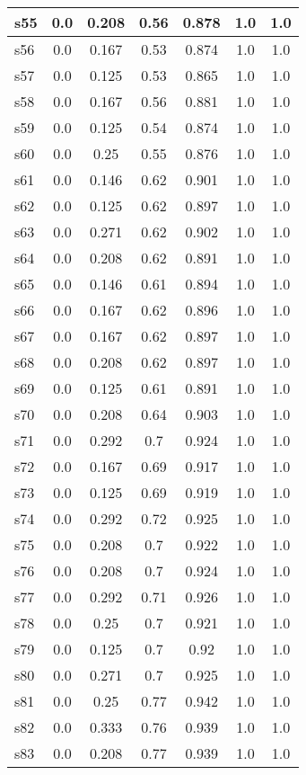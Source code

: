 \documentclass{article}
\begin{document}
\begin{tabular}{|l|c|c|c|c|c|c|}
s55 &0.0 & 0.208 & 0.56 & 0.878 & 1.0 & 1.0\\
\hline
s56 &0.0 & 0.167 & 0.53 & 0.874 & 1.0 & 1.0\\
\hline
s57 &0.0 & 0.125 & 0.53 & 0.865 & 1.0 & 1.0\\
\hline
s58 &0.0 & 0.167 & 0.56 & 0.881 & 1.0 & 1.0\\
\hline
s59 &0.0 & 0.125 & 0.54 & 0.874 & 1.0 & 1.0\\
\hline
s60 &0.0 & 0.25 & 0.55 & 0.876 & 1.0 & 1.0\\
\hline
s61 &0.0 & 0.146 & 0.62 & 0.901 & 1.0 & 1.0\\
\hline
s62 &0.0 & 0.125 & 0.62 & 0.897 & 1.0 & 1.0\\
\hline
s63 &0.0 & 0.271 & 0.62 & 0.902 & 1.0 & 1.0\\
\hline
s64 &0.0 & 0.208 & 0.62 & 0.891 & 1.0 & 1.0\\
\hline
s65 &0.0 & 0.146 & 0.61 & 0.894 & 1.0 & 1.0\\
\hline
s66 &0.0 & 0.167 & 0.62 & 0.896 & 1.0 & 1.0\\
\hline
s67 &0.0 & 0.167 & 0.62 & 0.897 & 1.0 & 1.0\\
\hline
s68 &0.0 & 0.208 & 0.62 & 0.897 & 1.0 & 1.0\\
\hline
s69 &0.0 & 0.125 & 0.61 & 0.891 & 1.0 & 1.0\\
\hline
s70 &0.0 & 0.208 & 0.64 & 0.903 & 1.0 & 1.0\\
\hline
s71 &0.0 & 0.292 & 0.7 & 0.924 & 1.0 & 1.0\\
\hline
s72 &0.0 & 0.167 & 0.69 & 0.917 & 1.0 & 1.0\\
\hline
s73 &0.0 & 0.125 & 0.69 & 0.919 & 1.0 & 1.0\\
\hline
s74 &0.0 & 0.292 & 0.72 & 0.925 & 1.0 & 1.0\\
\hline
s75 &0.0 & 0.208 & 0.7 & 0.922 & 1.0 & 1.0\\
\hline
s76 &0.0 & 0.208 & 0.7 & 0.924 & 1.0 & 1.0\\
\hline
s77 &0.0 & 0.292 & 0.71 & 0.926 & 1.0 & 1.0\\
\hline
s78 &0.0 & 0.25 & 0.7 & 0.921 & 1.0 & 1.0\\
\hline
s79 &0.0 & 0.125 & 0.7 & 0.92 & 1.0 & 1.0\\
\hline
s80 &0.0 & 0.271 & 0.7 & 0.925 & 1.0 & 1.0\\
\hline
s81 &0.0 & 0.25 & 0.77 & 0.942 & 1.0 & 1.0\\
\hline
s82 &0.0 & 0.333 & 0.76 & 0.939 & 1.0 & 1.0\\
\hline
s83 &0.0 & 0.208 & 0.77 & 0.939 & 1.0 & 1.0\\

\end{tabular}
\end{document}
